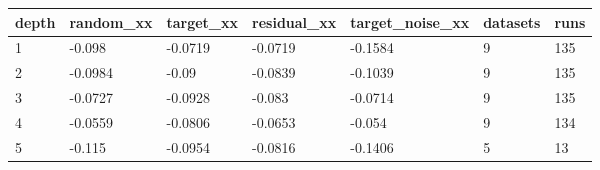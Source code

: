 \begin{tabular}{lllllll}
\toprule
depth & random\_xx & target\_xx & residual\_xx & target\_noise\_xx & datasets & runs \\
\midrule
1 & -0.098 & -0.0719 & -0.0719 & -0.1584 & 9 & 135 \\
2 & -0.0984 & -0.09 & -0.0839 & -0.1039 & 9 & 135 \\
3 & -0.0727 & -0.0928 & -0.083 & -0.0714 & 9 & 135 \\
4 & -0.0559 & -0.0806 & -0.0653 & -0.054 & 9 & 134 \\
5 & -0.115 & -0.0954 & -0.0816 & -0.1406 & 5 & 13 \\
\bottomrule
\end{tabular}

